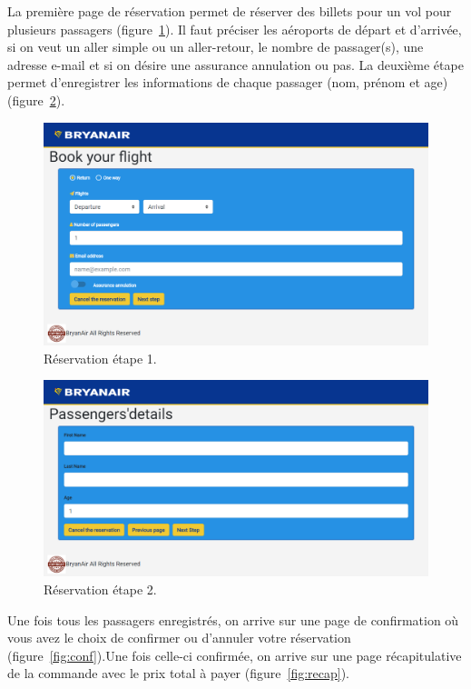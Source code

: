 \documentclass[12pt,a4paper]{article}
\begin{document}
		La première page de réservation permet de réserver des billets pour un vol pour plusieurs passagers (figure~\ref{fig:res1}). Il faut préciser les aéroports de départ et d'arrivée, si on veut un aller simple ou un aller-retour, le nombre de passager(s), une adresse e-mail et si on désire une assurance annulation ou pas.
    La deuxième étape permet d'enregistrer les informations de chaque passager (nom, prénom et age) (figure~\ref{fig:res2}).
		\begin{figure}[!p]
      \includegraphics[width=\textwidth]{Reservation.png}
			\caption{Réservation étape 1.}
			\label{fig:res1}
		\end{figure}

		\begin{figure}[!p]
      \includegraphics[width=\textwidth]{Detail.png}
			\caption{Réservation étape 2.}
			\label{fig:res2}
		\end{figure}

		Une fois tous les passagers enregistrés, on arrive sur une page de confirmation où vous avez le choix de confirmer ou d'annuler votre réservation (figure~\ref{fig:conf}).Une fois celle-ci confirmée, on arrive sur une page récapitulative de la commande avec le prix total à payer (figure~\ref{fig:recap}).
\end{document}
